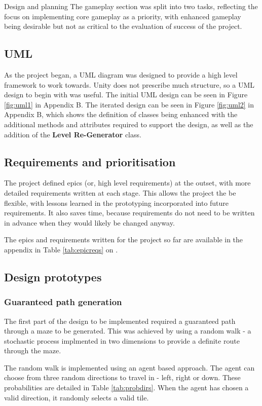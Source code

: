 \documentclass[progress]{cmpreport}
\begin{document}
\begin{section}{Design and planning}
The gameplay section was split into two tasks, reflecting the focus on implementing core gameplay as a priority, with enhanced gameplay being desirable but not as critical to the evaluation of success of the project.


\subsection{UML}

As the project began, a UML diagram was designed to provide a high level framework to work towards. Unity does not prescribe much structure, so a UML design to begin with was useful. The initial UML design can be seen in Figure \ref{fig:uml1} in Appendix B. The iterated design can be seen in Figure \ref{fig:uml2} in Appendix B, which shows the definition of classes being enhanced with the additional methods and attributes required to support the design, as well as the addition of the \textbf{Level Re-Generator} class.


\subsection{Requirements and prioritisation}

The project defined epics (or, high level requirements) at the outset, with more detailed requirements written at each stage. This allows the project the be flexible, with lessons learned in the prototyping incorporated into future requirements. It also saves time, because requirements do not need to be written in advance when they would likely be changed anyway.

The epics and requirements written for the project so far are available in the appendix in Table \ref{tab:epicreqs} on \pageref{tab:epicreqs}.


\subsection{Design prototypes}
\subsubsection{Guaranteed path generation}
The first part of the design to be implemented required a guaranteed path through a maze to be generated. This was achieved by using a random walk - a stochastic process implmented in two dimensions to provide a definite route through the maze.

The random walk is implemented using an agent based approach. The agent can choose from three random directions to travel in - left, right or down. These probabilities are detailed in Table \ref{tab:probdirs}. When the agent has chosen a valid direction, it randomly selects a valid tile. 


\end{section}
\end{document}
